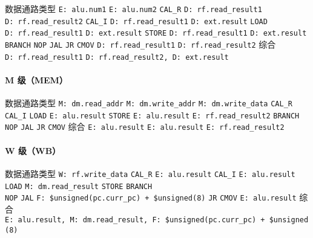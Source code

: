\documentclass[12pt,AutoFakeBold,AutoFakeSlant]{article}
\begin{document}
数据通路类型 \textbar{} \texttt{E:\ alu.num1} \textbar{}
\texttt{E:\ alu.num2} \texttt{CAL\_R} \textbar{}
\texttt{D:\ rf.read\_result1} \textbar{} \texttt{D:\ rf.read\_result2}
\texttt{CAL\_I} \textbar{} \texttt{D:\ rf.read\_result1} \textbar{}
\texttt{D:\ ext.result} \texttt{LOAD} \textbar{}
\texttt{D:\ rf.read\_result1} \textbar{} \texttt{D:\ ext.result}
\texttt{STORE} \textbar{} \texttt{D:\ rf.read\_result1} \textbar{}
\texttt{D:\ ext.result} \texttt{BRANCH} \textbar{} \textbar{}
\texttt{NOP} \textbar{} \textbar{} \texttt{JAL} \textbar{} \textbar{}
\texttt{JR} \textbar{} \textbar{} \texttt{CMOV} \textbar{}
\texttt{D:\ rf.read\_result1} \textbar{} \texttt{D:\ rf.read\_result2}
综合 \textbar{} \texttt{D:\ rf.read\_result1} \textbar{}
\texttt{D:\ rf.read\_result2,\ D:\ ext.result}

\hypertarget{m-ux7ea7mem}{%
\paragraph{M 级（MEM）}\label{m-ux7ea7mem}}

数据通路类型 \textbar{} \texttt{M:\ dm.read\_addr} \textbar{}
\texttt{M:\ dm.write\_addr} \textbar{} \texttt{M:\ dm.write\_data}
\texttt{CAL\_R} \textbar{} \textbar{} \textbar{} \texttt{CAL\_I}
\textbar{} \textbar{} \textbar{} \texttt{LOAD} \textbar{}
\texttt{E:\ alu.result} \textbar{} \textbar{} \textbar{} \texttt{STORE}
\textbar{} \textbar{} \texttt{E:\ alu.result} \textbar{}
\texttt{E:\ rf.read\_result2} \texttt{BRANCH} \textbar{} \textbar{}
\textbar{} \texttt{NOP} \textbar{} \textbar{} \textbar{} \texttt{JAL}
\textbar{} \textbar{} \textbar{} \texttt{JR} \textbar{} \textbar{}
\textbar{} \texttt{CMOV} \textbar{} \textbar{} \textbar{} 综合
\textbar{} \texttt{E:\ alu.result} \textbar{} \texttt{E:\ alu.result}
\textbar{} \texttt{E:\ rf.read\_result2}

\hypertarget{w-ux7ea7wb}{%
\paragraph{W 级（WB）}\label{w-ux7ea7wb}}

数据通路类型 \textbar{} \texttt{W:\ rf.write\_data} \texttt{CAL\_R}
\textbar{} \texttt{E:\ alu.result} \texttt{CAL\_I} \textbar{}
\texttt{E:\ alu.result} \texttt{LOAD} \textbar{}
\texttt{M:\ dm.read\_result} \texttt{STORE} \textbar{} \texttt{BRANCH}
\textbar{}\\
\texttt{NOP} \textbar{} \texttt{JAL} \textbar{}
\texttt{F:\ \$unsigned(pc.curr\_pc)\ +\ \$unsigned(8)} \texttt{JR}
\textbar{} \texttt{CMOV} \textbar{} \texttt{E:\ alu.result} 综合
\textbar{}
\texttt{E:\ alu.result,\ M:\ dm.read\_result,\ F:\ \$unsigned(pc.curr\_pc)\ +\ \$unsigned(8)}
\end{document}
